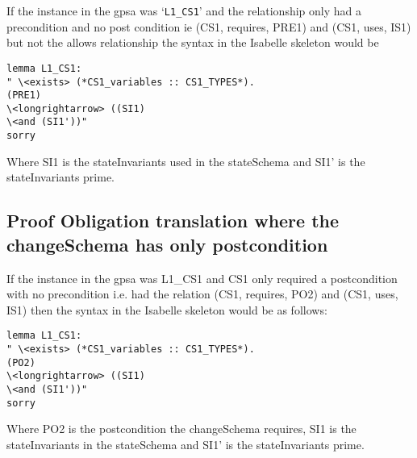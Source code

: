 If the instance in the \gls{gpsa} was `\texttt{L1\_CS1}' and the relationship
only had a precondition and no post condition ie (CS1, requires, PRE1) and (CS1,
uses, IS1) but not the allows relationship the syntax in the Isabelle skeleton
would be 

\begin{verbatim}
lemma L1_CS1:
" \<exists> (*CS1_variables :: CS1_TYPES*).
(PRE1)
\<longrightarrow> ((SI1)
\<and (SI1'))"
sorry
\end{verbatim}

Where SI1 is the stateInvariants used in the stateSchema and SI1' is the
stateInvariants prime.

\subsection{Proof Obligation translation where the changeSchema has only postcondition}

If the instance in the \gls{gpsa} was L1\_CS1 and CS1 only required a
postcondition with no precondition i.e. had the relation (CS1, requires, PO2)
and (CS1, uses, IS1) then the syntax in the Isabelle skeleton would be as
follows:

\begin{verbatim}
lemma L1_CS1:
" \<exists> (*CS1_variables :: CS1_TYPES*).
(PO2)
\<longrightarrow> ((SI1)
\<and (SI1'))"
sorry
\end{verbatim}

Where PO2 is the postcondition the changeSchema requires, SI1 is the
stateInvariants in the stateSchema and SI1' is the stateInvariants prime. 



